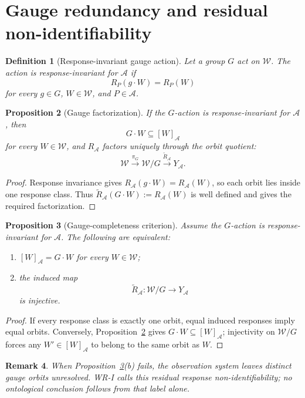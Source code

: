 \documentclass[11pt]{article}
\newtheorem{definition}{Definition}[section]
\newtheorem{proposition}[definition]{Proposition}
\newtheorem{remark}[definition]{Remark}
\newcommand{\W}{\mathcal W}
\newcommand{\Acal}{\mathcal A}
\begin{document}
\section{Gauge redundancy and residual non-identifiability}

\begin{definition}[Response-invariant gauge action]
Let a group $G$ act on $\W$. The action is response-invariant for $\Acal$ if
\[
R_P(g\cdot W)=R_P(W)
\]
for every $g\in G$, $W\in\W$, and $P\in\Acal$.
\end{definition}

\begin{proposition}[Gauge factorization]\label{prop:gauge-factor}
If the $G$-action is response-invariant for $\Acal$, then
\[
G\cdot W\subseteq[W]_{\Acal}
\]
for every $W\in\W$, and $R_{\Acal}$ factors uniquely through the orbit quotient:
\[
\W\xrightarrow{\pi_G}\W/G
\xrightarrow{\widetilde R_{\Acal}}Y_{\Acal}.
\]
\end{proposition}

\begin{proof}
Response invariance gives $R_{\Acal}(g\cdot W)=R_{\Acal}(W)$, so each orbit lies
inside one response class. Thus
$\widetilde R_{\Acal}(G\cdot W):=R_{\Acal}(W)$ is well defined and gives the
required factorization.
\end{proof}

\begin{proposition}[Gauge-completeness criterion]\label{prop:gauge-complete}
Assume the $G$-action is response-invariant for $\Acal$. The following are
equivalent:
\begin{enumerate}[label=(\alph*)]
\item $[W]_{\Acal}=G\cdot W$ for every $W\in\W$;
\item the induced map
\[
\widetilde R_{\Acal}:\W/G\to Y_{\Acal}
\]
is injective.
\end{enumerate}
\end{proposition}

\begin{proof}
If every response class is exactly one orbit, equal induced responses imply
equal orbits. Conversely, Proposition~\ref{prop:gauge-factor} gives
$G\cdot W\subseteq[W]_{\Acal}$; injectivity on $\W/G$ forces any
$W'\in[W]_{\Acal}$ to belong to the same orbit as $W$.
\end{proof}

\begin{remark}
When Proposition~\ref{prop:gauge-complete}(b) fails, the observation system
leaves distinct gauge orbits unresolved. WR-I calls this \emph{residual response
non-identifiability}; no ontological conclusion follows from that label alone.
\end{remark}
\end{document}
